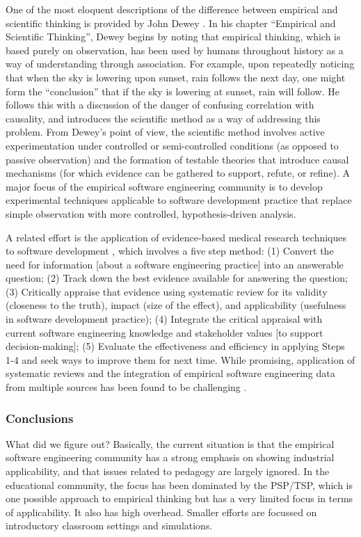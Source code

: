 One of the most eloquent descriptions of the difference between empirical and scientific thinking is provided by John Dewey \citep{Dewey10}.  In his chapter ``Empirical and Scientific Thinking'', Dewey begins by noting that empirical thinking, which is based purely on observation, has been used by humans throughout history as a way of understanding through association.  For example, upon repeatedly noticing that when the sky is lowering upon sunset, rain follows the next day, one might form the ``conclusion'' that if the sky is lowering at sunset, rain will follow.  He follows this with a discussion of the danger of confusing correlation with causality, and introduces the scientific method as a way of addressing this problem.  From Dewey's point of view, the scientific method involves active experimentation under controlled or semi-controlled conditions (as opposed to passive observation) and the formation of testable theories that introduce causal mechanisms (for which evidence can be gathered to support, refute, or refine).  A major focus of the empirical software engineering community is to develop experimental techniques applicable to software development practice that replace simple observation with more controlled, hypothesis-driven analysis.

A related effort is the application of evidence-based medical research techniques to software development \citep{Kitchenham04,Kitchenham04a}, which involves a five step method: (1) Convert the need for information [about a software engineering practice] into an answerable question; (2) Track down the best evidence available for answering the question; (3) Critically appraise that evidence using systematic review for its validity (closeness to the truth), impact (size of the effect), and applicability (usefulness in software development practice); (4) Integrate the critical appraisal with current software engineering knowledge and stakeholder values [to support decision-making]; (5) Evaluate the effectiveness and efficiency in applying Steps 1-4 and seek ways to improve them for next time.  While promising, application of systematic reviews and the integration of empirical software engineering data from multiple sources has been found to be challenging \cite{Jedlitschka04}.

\subsubsection{Conclusions}

What did we figure out?  Basically, the current situation is that the empirical software engineering community has a strong emphasis on showing industrial applicability, and that issues related to pedagogy are largely ignored.  In the educational community, the focus has been dominated by the PSP/TSP, which is one possible approach to empirical thinking but has a very limited focus in terms of applicability.  It also has high overhead.  Smaller efforts are focussed on introductory classroom settings and simulations.  

